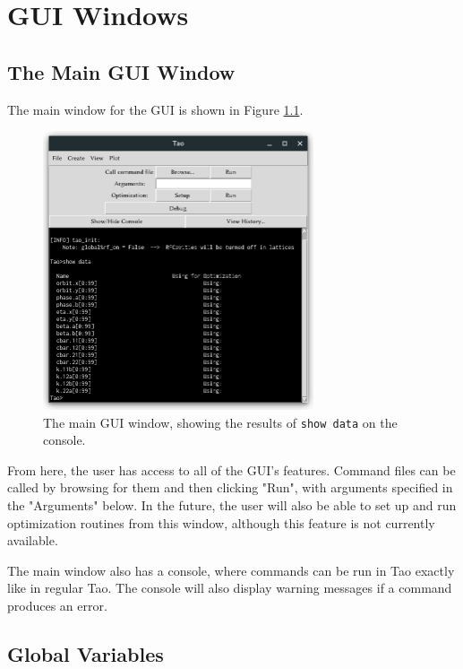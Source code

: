 \chapter{GUI Windows}

\section{The Main GUI Window}
\label{s:gui.root.window}

The main window for the GUI is shown in Figure \ref{fig:root.window}.
\begin{figure}
\centering
\includegraphics[width=8cm]{figures/root_window.png}
\caption{The main GUI window, showing the results of \texttt{show data} on the console.}
\label{fig:root.window}
\end{figure}
From here, the user has access to all of the GUI's features.
Command files can be called by browsing for them and then clicking "Run", with arguments specified in the "Arguments" below.
In the future, the user will also be able to set up and run optimization routines from this window, although this feature is not currently available.

The main window also has a console, where commands can be run in Tao exactly like in regular Tao.
The console will also display warning messages if a command produces an error.

\section{Global Variables}
\label{s:gui.global.variables}

